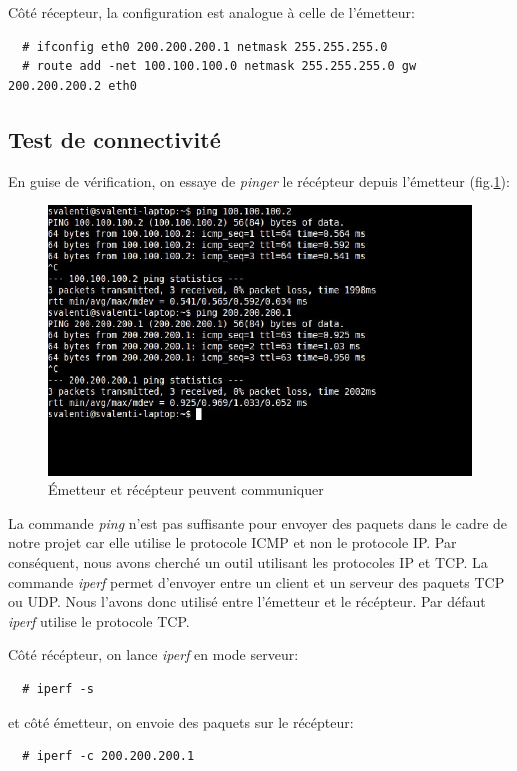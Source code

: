 \documentclass[a4paper]{article}
\begin{document}
Côté récepteur, la configuration est analogue à celle de l'émetteur:
\begin{verbatim}
  # ifconfig eth0 200.200.200.1 netmask 255.255.255.0
  # route add -net 100.100.100.0 netmask 255.255.255.0 gw 200.200.200.2 eth0
\end{verbatim}

\subsection{Test de connectivité}
En guise de vérification, on essaye de \textit{pinger} le
récépteur depuis l'émetteur (fig.\ref{ping1}):

\begin{figure}[!ht]
	\centering
	\includegraphics[scale=.5]{ping.jpg}
	\caption{\label{ping1} Émetteur et récépteur peuvent communiquer}
\end{figure}

La commande \textit{ping} n'est pas suffisante pour envoyer
des paquets dans le cadre de notre projet car elle utilise
le protocole ICMP et non le protocole IP. Par conséquent,
nous avons cherché un outil utilisant les protocoles IP et TCP.
La commande \textit{iperf} permet d'envoyer entre un client et
un serveur des paquets TCP ou UDP. Nous l'avons donc utilisé
entre l'émetteur et le récépteur. Par défaut \textit{iperf}
utilise le protocole TCP.

Côté récépteur, on lance \textit{iperf} en mode serveur:
\begin{verbatim}
  # iperf -s
\end{verbatim}

et côté émetteur, on envoie des paquets sur le récépteur:
\begin{verbatim}
  # iperf -c 200.200.200.1
\end{verbatim}
\end{document}
